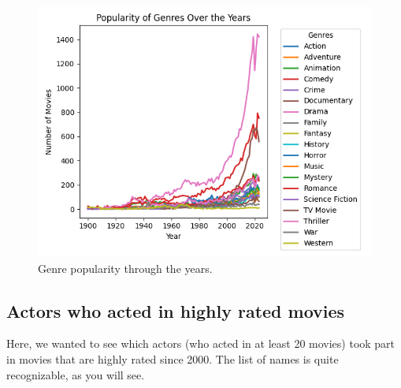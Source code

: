 \documentclass{Configuration_Files/PoliMi3i_thesis}
\begin{document}
\begin{figure}[!h]
  \centering
  \includegraphics[width=\textwidth]{Project Template/letterboxd/visualization/genre_popularity.png}
  \caption{Genre popularity through the years.}
  \label{fig:genre_popularity}
\end{figure}

\subsection{Actors who acted in highly rated movies}

Here, we wanted to see which actors (who acted in at least 20 movies) took part in movies that are highly rated since 2000. The list of names is quite recognizable, as you will see.

\inputminted[frame=single,framesep=10pt,breaklines]{cypher}{letterboxd/queries/query6.cypher}
\end{document}
